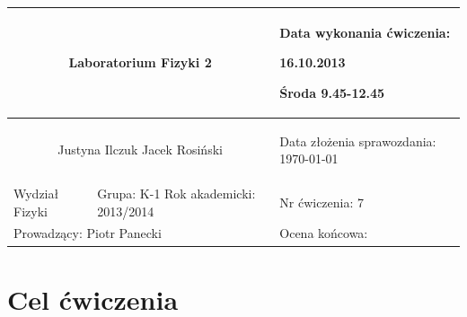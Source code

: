 \documentclass[a4paper,12pt]{article}
\author{Justyna Ilczuk, Jacek Rosiński}
\begin{document}
\begin{center}

    \begin{tabular}{ | m{5cm}| m{5cm} | m{5cm} |}
    \hline 
    \multicolumn{2}{|c|}{{ \Large \textbf{Laboratorium Fizyki 2}} }
    &  
    \begin{center}
    Data wykonania ćwiczenia:
    \end{center}
    \begin{center}
      16.10.2013 
    \end{center}
    \begin{center}
    Środa 9.45-12.45
    \end{center}
     \\ 
    
    \hline
    \multicolumn{2}{|c|}{Justyna Ilczuk \newline Jacek Rosiński}
    & \begin{center}
    {\small Data złożenia sprawozdania:} \newline \today
    \end{center}   \\
   	
   	\hline
    Wydział Fizyki & Grupa: K-1 \newline Rok akademicki: 2013/2014 &    Nr ćwiczenia: 7 \\
   	\hline
   	\multicolumn{2}{|l|}{Prowadzący: Piotr Panecki} & \multicolumn{1}{|l|}{Ocena końcowa:}\\
    \hline
    \end{tabular}
\end{center}

\newpage

\pagestyle{fancy}
\fancyfoot[CO]{\ }
\fancyhead[RO]{\footnotesize{\thepage} }




\section{Cel ćwiczenia}
\end{document}
